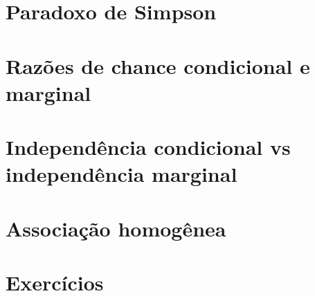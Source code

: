 \documentclass[]{book}
\begin{document}
\hypertarget{paradoxo-de-simpson}{%
\section{Paradoxo de Simpson}\label{paradoxo-de-simpson}}

\hypertarget{razoes-de-chance-condicional-e-marginal}{%
\section{Razões de chance condicional e marginal}\label{razoes-de-chance-condicional-e-marginal}}

\hypertarget{independencia-condicional-vs-independencia-marginal}{%
\section{Independência condicional vs independência marginal}\label{independencia-condicional-vs-independencia-marginal}}

\hypertarget{associacao-homogenea}{%
\section{Associação homogênea}\label{associacao-homogenea}}

\hypertarget{exercicios-1}{%
\section{Exercícios}\label{exercicios-1}}


\end{document}
